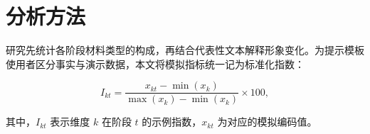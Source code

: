 \section{分析方法}

研究先统计各阶段材料类型的构成，再结合代表性文本解释形象变化。为提示模板使用者区分事实与演示数据，本文将模拟指标统一记为标准化指数：

\begin{equation}
  I_{kt}=\frac{x_{kt}-\min(x_k)}{\max(x_k)-\min(x_k)}\times 100,
\end{equation}

其中，$I_{kt}$ 表示维度 $k$ 在阶段 $t$ 的示例指数，$x_{kt}$ 为对应的模拟编码值。
